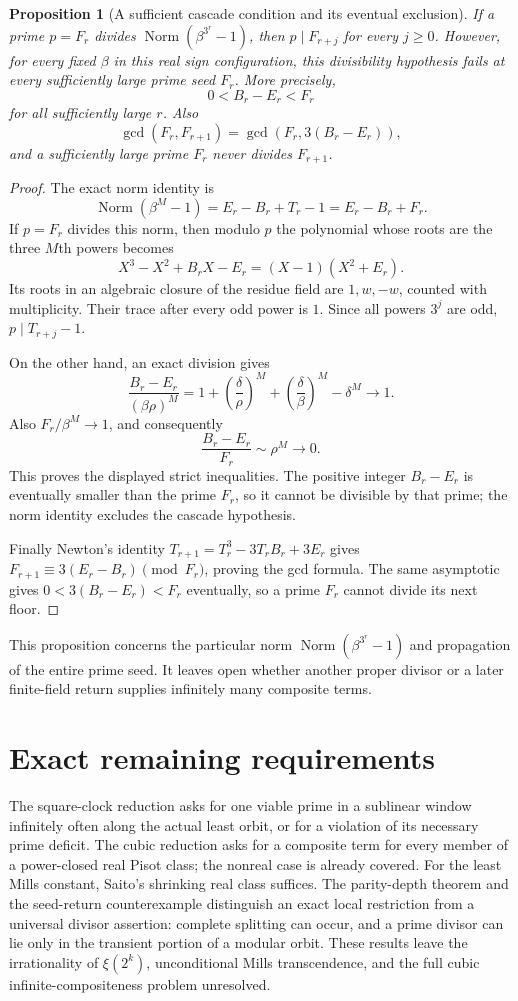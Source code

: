 \documentclass[11pt,a4paper]{article}
\newtheorem{proposition}[theorem]{Proposition}
\theoremstyle{definition}
\theoremstyle{remark}
\numberwithin{equation}{section}
\begin{document}
\begin{proposition}[A sufficient cascade condition and its eventual exclusion]
\label{ft:prop:positive-cascade}
If a prime $p=F_r$ divides
$\operatorname{Norm}(\beta^{3^r}-1)$, then $p\mid F_{r+j}$ for every
$j\ge0$. However, for every fixed $\beta$ in this real sign
configuration, this divisibility hypothesis fails at every sufficiently
large prime seed $F_r$. More precisely,
\[
 0<B_r-E_r<F_r
\]
for all sufficiently large $r$. Also
\[
 \gcd(F_r,F_{r+1})=\gcd(F_r,3(B_r-E_r)),
\]
and a sufficiently large prime $F_r$ never divides $F_{r+1}$.
\end{proposition}
\begin{proof}
The exact norm identity is
\[
 \operatorname{Norm}(\beta^M-1)=E_r-B_r+T_r-1
 =E_r-B_r+F_r.
\]
If $p=F_r$ divides this norm, then modulo $p$ the polynomial whose
roots are the three $M$th powers becomes
\[
 X^3-X^2+B_rX-E_r=(X-1)(X^2+E_r).
\]
Its roots in an algebraic closure of the residue field are
$1,w,-w$, counted with multiplicity. Their trace after every odd
power is $1$. Since all powers $3^j$ are odd, $p\mid T_{r+j}-1$.

On the other hand, an exact division gives
\[
 \frac{B_r-E_r}{(\beta\rho)^M}
 =1+\left(\frac\delta\rho\right)^M
   +\left(\frac\delta\beta\right)^M-\delta^M
 \longrightarrow1.
\]
Also $F_r/\beta^M\to1$, and consequently
\[
 \frac{B_r-E_r}{F_r}\sim\rho^M\longrightarrow0.
\]
This proves the displayed strict inequalities. The positive integer
$B_r-E_r$ is eventually smaller than the prime $F_r$, so it cannot
be divisible by that prime; the norm identity excludes the cascade
hypothesis.

Finally Newton's identity
$T_{r+1}=T_r^3-3T_rB_r+3E_r$ gives
$F_{r+1}\equiv3(E_r-B_r)\pmod{F_r}$, proving the gcd formula.
The same asymptotic gives $0<3(B_r-E_r)<F_r$ eventually, so a prime
$F_r$ cannot divide its next floor.
\end{proof}

This proposition concerns the particular norm
$\operatorname{Norm}(\beta^{3^r}-1)$ and propagation of the entire
prime seed. It leaves open whether another proper divisor or a later
finite-field return supplies infinitely many composite terms.

\section{Exact remaining requirements}
\label{ft:sec:remaining}

The square-clock reduction asks for one viable prime in a sublinear
window infinitely often along the actual least orbit, or for a violation
of its necessary prime deficit. The cubic reduction asks for a composite
term for every member of a power-closed real Pisot class; the nonreal
case is already covered. For the least Mills constant, Saito's shrinking
real class suffices. The parity-depth theorem and the seed-return
counterexample distinguish an exact local restriction from a universal
divisor assertion: complete splitting can occur, and a prime divisor can
lie only in the transient portion of a modular orbit. These results
leave the irrationality of $\xi(2^k)$, unconditional Mills transcendence,
and the full cubic infinite-compositeness problem unresolved.
\end{document}
